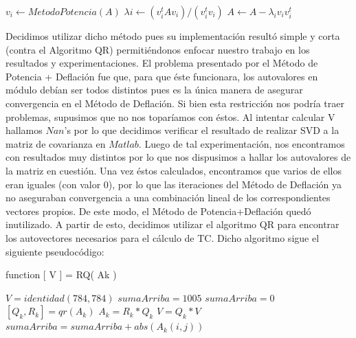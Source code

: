 \documentclass[10pt, a4paper]{article}
\begin{document}
\begin{algorithm}[H]
\begin{algorithmic}[1]
    \State $v_{i}\gets MetodoPotencia(A)$
    \State $\lambda{i}\gets (v_{i}^t A v_{i})/(v_{i}^t v_{i})$
   \State $A\gets A - \lambda_{i} v_{i} v_{i}^t$
\EndFor
\end{algorithmic}
\end{algorithm}

Decidimos utilizar dicho método pues su implementación resultó simple y corta (contra el Algoritmo QR) permitiéndonos enfocar nuestro trabajo en los resultados y experimentaciones.\newline
El problema presentado por el Método de Potencia + Deflación fue que, para que éste funcionara, los autovalores en módulo debían ser todos distintos pues es la única manera de asegurar convergencia en el Método de Deflación. Si bien esta restricción nos podría traer problemas, supusimos que no nos toparíamos con éstos. Al intentar calcular V hallamos $Nan$'s por lo que decidimos verificar el resultado de realizar SVD a la matriz de covarianza en $Matlab$. Luego de tal experimentación, nos encontramos con resultados muy distintos por lo que nos dispusimos a hallar los autovalores de la matriz en cuestión. Una vez éstos calculados, encontramos que varios de ellos eran iguales (con valor 0), por lo que las iteraciones del Método de Deflación ya no aseguraban convergencia a una combinación lineal de los correspondientes vectores propios. De este modo, el Método de Potencia+Deflación quedó inutilizado.\newline
\newline
A partir de esto, decidimos utilizar el algoritmo QR para encontrar los autovectores necesarios para el cálculo de TC. Dicho algoritmo sigue el siguiente pseudocódigo:\newline
\begin{algorithm}[H]
\caption {function [ V ] = RQ( Ak )}
\begin{algorithmic}[1]
\Repeat
    \State $V=identidad(784,784)$
    \State $sumaArriba = 1005$
   \State $sumaArriba = 0$
   \State $[Q_{k},R_{k}] = qr(A_{k})$
   \State $A_{k} = R_{k}*Q_{k}$
   \State $V = Q_{k}*V$
   \State $sumaArriba = sumaArriba + abs(A_{k}(i,j))$
   \EndFor
   \EndFor
   \EndWhile
{}
\end{algorithmic}
\end{algorithm}
\end{document}
